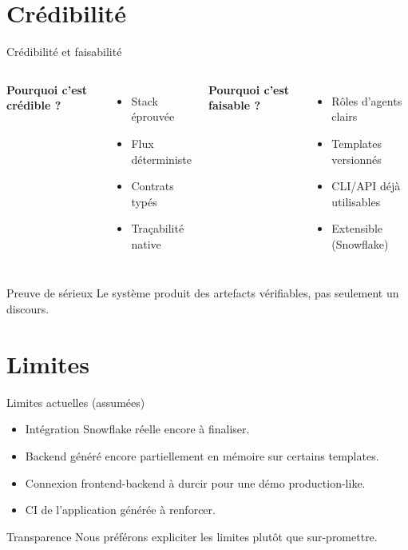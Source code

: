 \documentclass[aspectratio=169,10pt]{beamer}
\begin{document}
\section{Crédibilité}
\begin{frame}{Crédibilité et faisabilité}
\begin{columns}[T]
\textbf{Pourquoi c'est crédible ?}
\begin{itemize}
  \item Stack éprouvée
  \item Flux déterministe
  \item Contrats typés
  \item Traçabilité native
\end{itemize}
\textbf{Pourquoi c'est faisable ?}
\begin{itemize}
  \item Rôles d'agents clairs
  \item Templates versionnés
  \item CLI/API déjà utilisables
  \item Extensible (Snowflake)
\end{itemize}
\end{columns}
\vspace{0.2cm}
\begin{alertblock}{Preuve de sérieux}
Le système produit des artefacts vérifiables, pas seulement un discours.
\end{alertblock}
\end{frame}

\section{Limites}
\begin{frame}{Limites actuelles (assumées)}
\begin{itemize}
  \item Intégration Snowflake réelle encore à finaliser.
  \item Backend généré encore partiellement en mémoire sur certains templates.
  \item Connexion frontend-backend à durcir pour une démo production-like.
  \item CI de l'application générée à renforcer.
\end{itemize}
\vspace{0.2cm}
\begin{alertblock}{Transparence}
Nous préférons expliciter les limites plutôt que sur-promettre.
\end{alertblock}
\end{frame}
\end{document}
